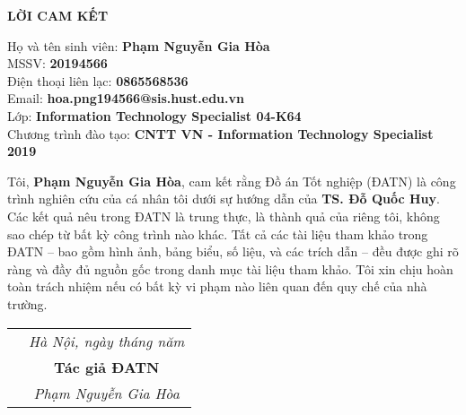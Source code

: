 \documentclass[../DoAn.tex]{subfiles}
\begin{document}
\begin{center}
    \LARGE\textbf{LỜI CAM KẾT}
\end{center}

\vspace{1cm}

Họ và tên sinh viên: \textbf{Phạm Nguyễn Gia Hòa}\\
MSSV: \textbf{20194566}\\
Điện thoại liên lạc: \textbf{0865568536}\\
Email: \textbf{hoa.png194566@sis.hust.edu.vn}\\
Lớp: \textbf{Information Technology Specialist 04-K64}\\
Chương trình đào tạo: \textbf{CNTT VN - Information Technology Specialist 2019}\\

\vspace{1cm}

Tôi, \textbf{Phạm Nguyễn Gia Hòa}, cam kết rằng Đồ án Tốt nghiệp (ĐATN) là công trình nghiên cứu của cá nhân tôi dưới sự hướng dẫn của \textbf{TS. Đỗ Quốc Huy}. Các kết quả nêu trong ĐATN là trung thực, là thành quả của riêng tôi, không sao chép từ bất kỳ công trình nào khác. Tất cả các tài liệu tham khảo trong ĐATN – bao gồm hình ảnh, bảng biểu, số liệu, và các trích dẫn – đều được ghi rõ ràng và đầy đủ nguồn gốc trong danh mục tài liệu tham khảo. Tôi xin chịu hoàn toàn trách nhiệm nếu có bất kỳ vi phạm nào liên quan đến quy chế của nhà trường.

\vspace{1cm}

\begin{table}[H]
\centering
\begin{tabular}{p{7cm} c}
\multicolumn{1}{c}{} & \textit{Hà Nội, ngày\hspace{0.5cm} tháng\hspace{0.5cm} năm\hspace{0.5cm}} \vspace{0.4cm}\\
\textbf{}            & \textbf{Tác giả ĐATN} \vspace{3cm} \\
\textbf{}            & \textit{Phạm Nguyễn Gia Hòa}
\end{tabular}
\end{table}
\end{document}
